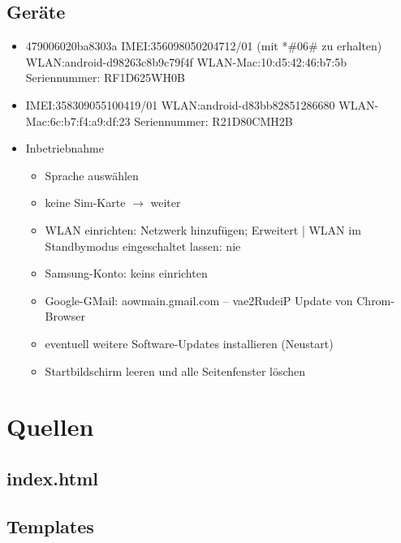 \documentclass[a4paper]{scrartcl}
\begin{document}
		\subsection{Geräte}
			\begin{itemize}
				\item 479006020ba8303a \newline
					IMEI:356098050204712/01 (mit *\#06\# zu erhalten) \newline
					WLAN:android-d98263c8b9c79f4f \newline
					WLAN-Mac:10:d5:42:46:b7:5b \newline
					Seriennummer: RF1D625WH0B
				\item  
					IMEI:358309055100419/01 \newline
					WLAN:android-d83bb82851286680 \newline
					WLAN-Mac:6c:b7:f4:a9:df:23 \newline
					Seriennummer: R21D80CMH2B
				\item Inbetriebnahme
					\begin{itemize}
						\item Sprache auswählen
						\item keine Sim-Karte $\rightarrow$ weiter
						\item WLAN einrichten: Netzwerk hinzufügen; Erweitert | WLAN im Standbymodus eingeschaltet lassen: nie
						\item Samsung-Konto: keins einrichten
						\item Google-GMail: aowmain.gmail.com -- vae2RudeiP\newline
							Update von Chrom-Browser
						\item eventuell weitere Software-Updates installieren (Neustart)
						\item Startbildschirm leeren und alle Seitenfenster löschen

					\end{itemize}
			\end{itemize}
		\section{Quellen}
			\subsection{index.html}
				
			\subsection{Templates}
\end{document}
